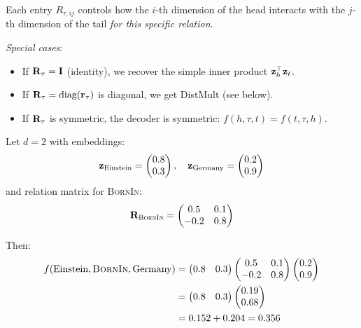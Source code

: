 \begin{notechapter}
\begin{intuition}
Each entry $R_{\tau,ij}$ controls how the $i$-th dimension of the head interacts with the $j$-th dimension of the tail \emph{for this specific relation}.

\emph{Special cases}:
\begin{itemize}
    \item If $\mathbf{R}_\tau = \mathbf{I}$ (identity), we recover the simple inner product $\mathbf{z}_h^\top \mathbf{z}_t$.
    \item If $\mathbf{R}_\tau = \operatorname{diag}(\mathbf{r}_\tau)$ is diagonal, we get DistMult (see below).
    \item If $\mathbf{R}_\tau$ is symmetric, the decoder is symmetric: $f(h, \tau, t) = f(t, \tau, h)$.
\end{itemize}
\end{intuition}

\begin{example}
Let $d = 2$ with embeddings:
\[
\mathbf{z}_{\text{Einstein}} = \begin{pmatrix} 0.8 \\ 0.3 \end{pmatrix}, \quad
\mathbf{z}_{\text{Germany}} = \begin{pmatrix} 0.2 \\ 0.9 \end{pmatrix}
\]
and relation matrix for \textsc{BornIn}:
\[
\mathbf{R}_{\textsc{BornIn}} = \begin{pmatrix} 0.5 & 0.1 \\ -0.2 & 0.8 \end{pmatrix}
\]

Then:
\begin{align*}
f(\text{Einstein}, \textsc{BornIn}, \text{Germany}) &= \begin{pmatrix} 0.8 & 0.3 \end{pmatrix}
\begin{pmatrix} 0.5 & 0.1 \\ -0.2 & 0.8 \end{pmatrix}
\begin{pmatrix} 0.2 \\ 0.9 \end{pmatrix} \\
&= \begin{pmatrix} 0.8 & 0.3 \end{pmatrix} \begin{pmatrix} 0.19 \\ 0.68 \end{pmatrix} \\
&= 0.152 + 0.204 = 0.356
\end{align*}


\end{example}
\end{notechapter}
